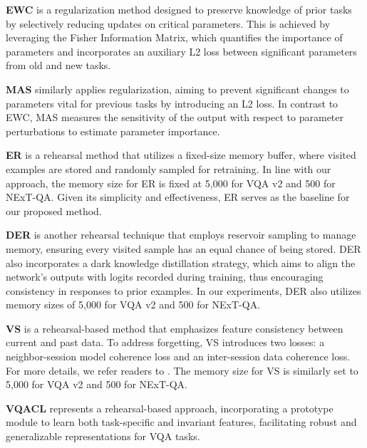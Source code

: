 \textbf{EWC} \citep{kirkpatrick2017overcoming} is a regularization method designed to preserve knowledge of prior tasks by selectively reducing updates on critical parameters. This is achieved by leveraging the Fisher Information Matrix, which quantifies the importance of parameters and incorporates an auxiliary L2 loss between significant parameters from old and new tasks.

\textbf{MAS} \citep{mas2018} similarly applies regularization, aiming to prevent significant changes to parameters vital for previous tasks by introducing an L2 loss. In contrast to EWC, MAS measures the sensitivity of the output with respect to parameter perturbations to estimate parameter importance.

\textbf{ER} \citep{chaudhry2019tinyepisodicmemoriescontinual} is a rehearsal method that utilizes a fixed-size memory buffer, where visited examples are stored and randomly sampled for retraining. In line with our approach, the memory size for ER is fixed at 5,000 for VQA v2 and 500 for NExT-QA. Given its simplicity and effectiveness, ER serves as the baseline for our proposed method.

\textbf{DER} \citep{Chaudhry2019er} is another rehearsal technique that employs reservoir sampling to manage memory, ensuring every visited sample has an equal chance of being stored. DER also incorporates a dark knowledge distillation strategy, which aims to align the network’s outputs with logits recorded during training, thus encouraging consistency in responses to prior examples. In our experiments, DER also utilizes memory sizes of 5,000 for VQA v2 and 500 for NExT-QA.

\textbf{VS} \citep{Wan_2022_CVPR} is a rehearsal-based method that emphasizes feature consistency between current and past data. To address forgetting, VS introduces two losses: a neighbor-session model coherence loss and an inter-session data coherence loss. For more details, we refer readers to \citet{Wan_2022_CVPR}. The memory size for VS is similarly set to 5,000 for VQA v2 and 500 for NExT-QA.

\textbf{VQACL} \citep{zhang2023vqacl} represents a rehearsal-based approach, incorporating a prototype module to learn both task-specific and invariant features, facilitating robust and generalizable representations for VQA tasks.
